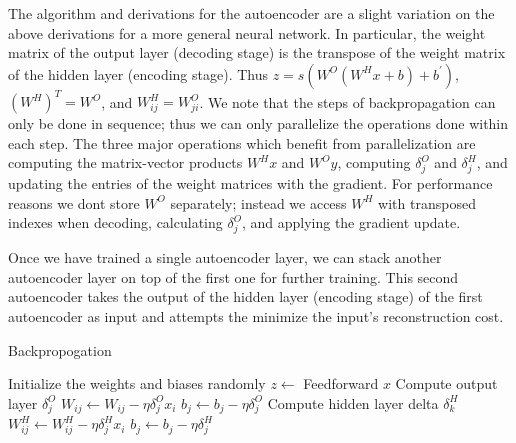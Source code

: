 \documentclass[conference]{IEEEtran}
\begin{document}
The algorithm and derivations for the autoencoder are a slight variation on the above derivations for a more general neural network. In particular, the weight matrix of the output layer (decoding stage) is the transpose of the weight matrix of the hidden layer (encoding stage). Thus $z=s(W^{O}(W^{H}x + b) + b^{'})$, $(W^H)^T = W^O$, and $W^H_{ij} = W^O_{ji}$. We note that the steps of backpropagation can only be done in sequence; thus we can only parallelize the operations done within each step. The three major operations which benefit from parallelization are computing the matrix-vector products $W^{H}x$ and $W^{O}y$, computing $\delta^O_j$ and $\delta^H_j$, and updating the entries of the weight matrices with the gradient. For performance reasons we dont store $W^O$ separately; instead we access $W^H$ with transposed indexes when decoding, calculating $\delta^O_j$, and applying the gradient update.

Once we have trained a single autoencoder layer, we can stack another autoencoder layer on top of the first one for further training. This second autoencoder takes the output of the hidden layer (encoding stage) of the first autoencoder as input and attempts the minimize the input's reconstruction cost.

\begin{algorithm}[h]
\caption{Backpropogation}
\label{alg:backprop}
\begin{algorithmic}
\STATE Initialize the weights and biases randomly
		\STATE $z\gets$ Feedforward $x$
		\STATE Compute output layer $\delta_j^O$
		\STATE ${W_{ij} \leftarrow W_{ij} - \eta \delta^O_j x_i}$
		\STATE $b_j \leftarrow b_j - \eta\delta^O_j$
			\STATE Compute hidden layer delta $\delta_k^H$
			\STATE ${W^H_{ij} \leftarrow W^H_{ij} - \eta\delta^H_jx_i}$
			\STATE $b_j \leftarrow b_j - \eta\delta^H_j$
		\ENDFOR
	\ENDFOR
\ENDFOR
\end{algorithmic}
\end{algorithm}
\end{document}
